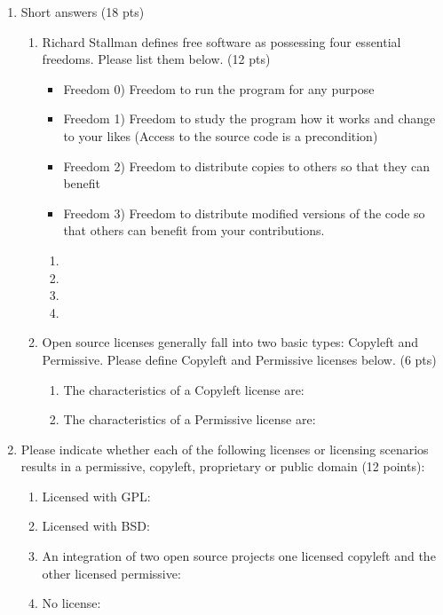 \documentclass[10pt]{article}
\begin{document}
\begin{enumerate}

\item Short answers (18 pts)

\begin{enumerate}
	\item Richard Stallman defines free software as possessing four essential freedoms. Please list them below. (12 pts)

\beginanswers
\begin{itemize}
\item Freedom 0) Freedom to run the program for any purpose
\item Freedom 1) Freedom to study the program how it works and change to your likes (Access to the source code is a precondition)
\item Freedom 2) Freedom to distribute copies to others so that they can benefit
\item Freedom 3) Freedom to distribute modified versions of the code so that others can benefit from your contributions.
\end{itemize}
\else
	\begin{enumerate}
	\item 
	\bigskip
	\bigskip
	\item
	\bigskip
	\bigskip
	\item 
	\bigskip
	\bigskip
	\item
	\bigskip
	\bigskip
\end{enumerate}
\fi
	\bigskip
	\bigskip

	\item Open source licenses generally fall into two basic types: Copyleft and Permissive. Please  define Copyleft and Permissive licenses below. (6 pts)
	\begin{enumerate}
		\item The characteristics of a Copyleft license are:
		\bigskip
		\bigskip
		\bigskip
		\bigskip
		\item The characteristics of a Permissive license are:
		\bigskip
		\bigskip
		\bigskip
		\bigskip
	\end{enumerate}

\end{enumerate}

\item Please indicate whether each of the following licenses or licensing scenarios results in a  permissive, copyleft, proprietary or public domain (12 points):
\begin{enumerate}
\item Licensed with GPL:
\bigskip
\bigskip
\item Licensed with BSD:
\bigskip
\bigskip
\item An integration of two open source projects one licensed copyleft and the other licensed permissive:
\bigskip
\bigskip
\item No license:
\bigskip
\bigskip


\end{enumerate}
\end{enumerate}
\end{document}
